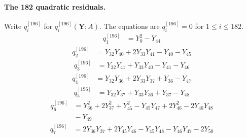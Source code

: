 \paragraph{The 182 quadratic residuals.}
Write $q_i^{[196]}$ for $q_i^{[196]}(\mathbf Y;A)$.
The equations are $q_i^{[196]}=0$ for $1\le i\le182$.
\begin{equation}\label{q196:row:001}
\begin{aligned}
q_{1}^{[196]} &={} Y_{0}^{2} - Y_{44}
\end{aligned}
\end{equation}
\begin{equation}\label{q196:row:002}
\begin{aligned}
q_{2}^{[196]} &={} Y_{32}Y_{40} + 2Y_{33}Y_{41} - Y_{40} - Y_{45}
\end{aligned}
\end{equation}
\begin{equation}\label{q196:row:003}
\begin{aligned}
q_{3}^{[196]} &={} Y_{32}Y_{41} + Y_{33}Y_{40} - Y_{41} - Y_{46}
\end{aligned}
\end{equation}
\begin{equation}\label{q196:row:004}
\begin{aligned}
q_{4}^{[196]} &={} Y_{32}Y_{36} + 2Y_{33}Y_{37} + Y_{36} - Y_{47}
\end{aligned}
\end{equation}
\begin{equation}\label{q196:row:005}
\begin{aligned}
q_{5}^{[196]} &={} Y_{32}Y_{37} + Y_{33}Y_{36} + Y_{37} - Y_{48}
\end{aligned}
\end{equation}
\begin{equation}\label{q196:row:006}
\begin{aligned}
q_{6}^{[196]} &={} Y_{36}^{2} + 2Y_{37}^{2} + Y_{45}^{2} - Y_{45}Y_{47} + 2Y_{46}^{2} - 2Y_{46}Y_{48}\\
&{} - Y_{49}
\end{aligned}
\end{equation}
\begin{equation}\label{q196:row:007}
\begin{aligned}
q_{7}^{[196]} &={} 2Y_{36}Y_{37} + 2Y_{45}Y_{46} - Y_{45}Y_{48} - Y_{46}Y_{47} - 2Y_{50}
\end{aligned}
\end{equation}
